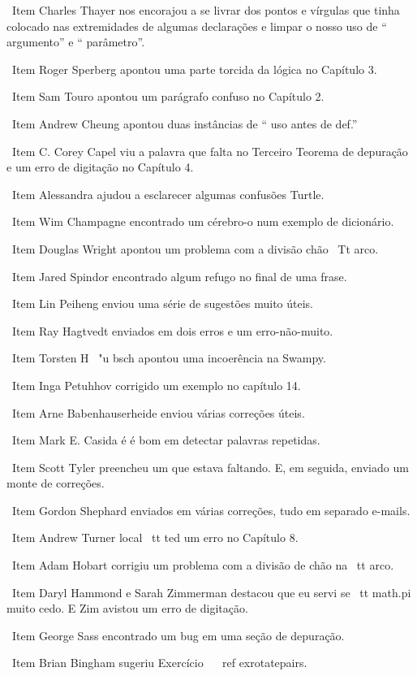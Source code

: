 \documentclass[10pt]{book}
\begin{document}
\ Item Charles Thayer nos encorajou a se livrar dos pontos e vírgulas
que tinha colocado nas extremidades de algumas declarações e limpar o nosso
uso de `` argumento'' e `` parâmetro''.

\ Item Roger Sperberg apontou uma parte torcida da lógica no Capítulo 3.

\ Item Sam Touro apontou um parágrafo confuso no Capítulo 2.

\ Item Andrew Cheung apontou duas instâncias de `` uso antes de def.''

\ Item C. Corey Capel viu a palavra que falta no Terceiro Teorema
de depuração e um erro de digitação no Capítulo 4.

\ Item Alessandra ajudou a esclarecer algumas confusões Turtle.

\ Item Wim Champagne encontrado um cérebro-o num exemplo de dicionário.

\ Item Douglas Wright apontou um problema com a divisão chão
{\ Tt arco}.

\ Item Jared Spindor encontrado algum refugo no final de uma frase.

\ Item Lin Peiheng enviou uma série de sugestões muito úteis.

\ Item Ray Hagtvedt enviados em dois erros e um erro-não-muito.

\ Item Torsten H \ "{u} bsch apontou uma incoerência na Swampy.

\ Item Inga Petuhhov corrigido um exemplo no capítulo 14.

\ Item Arne Babenhauserheide enviou várias correções úteis.

\ Item Mark E. Casida é é bom em detectar palavras repetidas.

\ Item Scott Tyler preencheu um que estava faltando. E, em seguida, enviado
um monte de correções.

\ Item Gordon Shephard enviados em várias correções, tudo em separado
e-mails.

\ Item Andrew Turner {local \ tt} ted um erro no Capítulo 8.

\ Item Adam Hobart corrigiu um problema com a divisão de chão na {\ tt arco}.

\ Item Daryl Hammond e Sarah Zimmerman destacou que eu servi
se {\ tt math.pi} muito cedo. E Zim avistou um erro de digitação.

\ Item George Sass encontrado um bug em uma seção de depuração.

\ Item Brian Bingham sugeriu Exercício ~ \ ref {} exrotatepairs.
\end{document}
